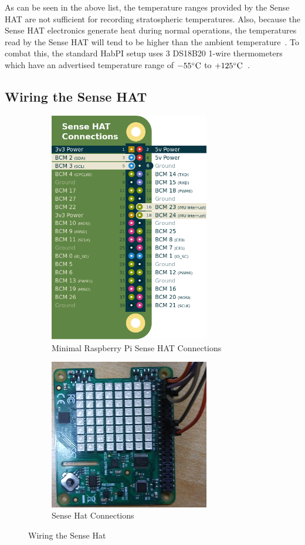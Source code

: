 \documentclass[journal]{new-aiaa}
\begin{document}
As can be seen in the above list, the temperature ranges provided by
the Sense HAT are not sufficient for recording stratospheric
temperatures.  Also,
because the Sense HAT electronics generate heat during normal operations, the
temperatures read by the Sense HAT will tend to be higher than the
ambient temperature~\cite{SenseHat-API}.  To combat this, the standard
HabPI setup uses 3 DS18B20 1-wire thermometers which have an
advertised temperature range of $-55\celsius$ to
$+125\celsius$~\cite{DS18B20}.

\subsection{Wiring the Sense HAT}
\begin{figure}
    \centering
    \begin{subfigure}{.45\textwidth}
        \centering
        \includegraphics[width=2.75in]{images/rpi-sensehat}
        \caption{Minimal Raspberry Pi Sense HAT
        Connections~\cite{pinout}}
        \label{fig:pinout}
    \end{subfigure}
    \begin{subfigure}{.45\textwidth}
        \centering
        \includegraphics[width=2.75in]{images/sensehat}
        \caption{Sense Hat Connections}
        \label{fig:hat}
    \end{subfigure}
    \caption{Wiring the Sense Hat}
    \label{fig:hatwiring}
\end{figure}
\end{document}
